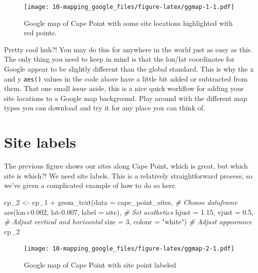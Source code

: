 \documentclass[
]{book}
\newenvironment{Shaded}{\begin{snugshade}}{\end{snugshade}}
\newcommand{\AttributeTok}[1]{\textcolor[rgb]{0.77,0.63,0.00}{#1}}
\newcommand{\CommentTok}[1]{\textcolor[rgb]{0.56,0.35,0.01}{\textit{#1}}}
\newcommand{\DecValTok}[1]{\textcolor[rgb]{0.00,0.00,0.81}{#1}}
\newcommand{\FloatTok}[1]{\textcolor[rgb]{0.00,0.00,0.81}{#1}}
\newcommand{\FunctionTok}[1]{\textcolor[rgb]{0.00,0.00,0.00}{#1}}
\newcommand{\NormalTok}[1]{#1}
\newcommand{\OtherTok}[1]{\textcolor[rgb]{0.56,0.35,0.01}{#1}}
\newcommand{\SpecialCharTok}[1]{\textcolor[rgb]{0.00,0.00,0.00}{#1}}
\newcommand{\StringTok}[1]{\textcolor[rgb]{0.31,0.60,0.02}{#1}}
\begin{document}
\begin{figure}
\centering
\texttt{[image: 10-mapping\_google\_files/figure-latex/ggmap-1-1.pdf]}
\caption{\label{fig:ggmap-1}Google map of Cape Point with some site locations highlighted with red points.}
\end{figure}

Pretty cool huh?! You may do this for anywhere in the world just as easy as this. The only thing you need to keep in mind is that the lon/lat coordinates for Google appear to be slightly different than the global standard. This is why the x and y \texttt{aes()} values in the code above have a little bit added or subtracted from them. That one small issue aside, this is a nice quick workflow for adding your site locations to a Google map background. Play around with the different map types you can download and try it for any place you can think of.

\hypertarget{site-labels}{%
\section{Site labels}\label{site-labels}}

The previous figure shows our sites along Cape Point, which is great, but which site is which?! We need site labels. This is a relatively straightforward process, so we've given a complicated example of how to do so here.

\begin{Shaded}
\begin{Highlighting}[]
\NormalTok{cp\_2 }\OtherTok{\textless{}{-}}\NormalTok{ cp\_1 }\SpecialCharTok{+}
  \FunctionTok{geom\_text}\NormalTok{(}\AttributeTok{data =}\NormalTok{ cape\_point\_sites, }\CommentTok{\# Choose dataframe}
            \FunctionTok{aes}\NormalTok{(lon}\FloatTok{+0.002}\NormalTok{, lat}\FloatTok{{-}0.007}\NormalTok{, }\AttributeTok{label =}\NormalTok{ site), }\CommentTok{\# Set aesthetics}
            \AttributeTok{hjust =} \FloatTok{1.15}\NormalTok{, }\AttributeTok{vjust =} \FloatTok{0.5}\NormalTok{, }\CommentTok{\# Adjust vertical and horizontal}
            \AttributeTok{size =} \DecValTok{3}\NormalTok{, }\AttributeTok{colour =} \StringTok{"white"}\NormalTok{) }\CommentTok{\# Adjust appearance}
\NormalTok{cp\_2}
\end{Highlighting}
\end{Shaded}

\begin{figure}
\centering
\texttt{[image: 10-mapping\_google\_files/figure-latex/ggmap-2-1.pdf]}
\caption{\label{fig:ggmap-2}Google map of Cape Point with site point labeled}
\end{figure}
\end{document}
